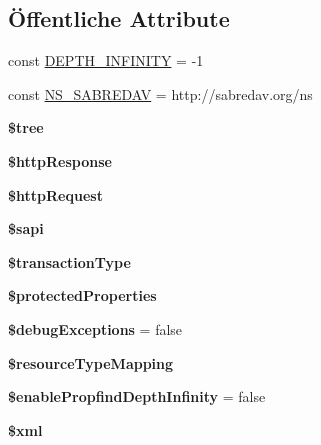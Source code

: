 \subsection*{Öffentliche Attribute}
\begin{DoxyCompactItemize}
\item 
const \mbox{\hyperlink{class_sabre_1_1_d_a_v_1_1_server_a038019ed8da25e71c226240edf93d415}{D\+E\+P\+T\+H\+\_\+\+I\+N\+F\+I\+N\+I\+TY}} = -\/1
\item 
const \mbox{\hyperlink{class_sabre_1_1_d_a_v_1_1_server_a866ccf12b4b09dedd1f6c59c0151b1e2}{N\+S\+\_\+\+S\+A\+B\+R\+E\+D\+AV}} = \textquotesingle{}http\+://sabredav.\+org/ns\textquotesingle{}
\item 
\mbox{\label{class_sabre_1_1_d_a_v_1_1_server_a56cba28d7189a880f2ee9da59fd6760a}} 
{\bfseries \$tree}
\item 
\mbox{\label{class_sabre_1_1_d_a_v_1_1_server_a8cb2689616ec9048b234e9f8fb11a12a}} 
{\bfseries \$http\+Response}
\item 
\mbox{\label{class_sabre_1_1_d_a_v_1_1_server_ac9983d3bf274bd8bd4826784c63fcc9a}} 
{\bfseries \$http\+Request}
\item 
\mbox{\label{class_sabre_1_1_d_a_v_1_1_server_a35a0dd741ef0d8d1c03f3b08353e82ef}} 
{\bfseries \$sapi}
\item 
\mbox{\label{class_sabre_1_1_d_a_v_1_1_server_a5ba3c5dc0b33881bfc448446c10f7a66}} 
{\bfseries \$transaction\+Type}
\item 
\mbox{\label{class_sabre_1_1_d_a_v_1_1_server_a4767a6a14c9b0bf3ef668765c8a40283}} 
{\bfseries \$protected\+Properties}
\item 
\mbox{\label{class_sabre_1_1_d_a_v_1_1_server_ae7087aa043590a331b5120d8c16fc7f4}} 
{\bfseries \$debug\+Exceptions} = false
\item 
{\bfseries \$resource\+Type\+Mapping}
\item 
\mbox{\label{class_sabre_1_1_d_a_v_1_1_server_aeacb8c612eee81ded4a94b19a6c2a988}} 
{\bfseries \$enable\+Propfind\+Depth\+Infinity} = false
\item 
\mbox{\label{class_sabre_1_1_d_a_v_1_1_server_a4274035be452d44fcf549e7bc58c76cc}} 
{\bfseries \$xml}
\end{DoxyCompactItemize}
